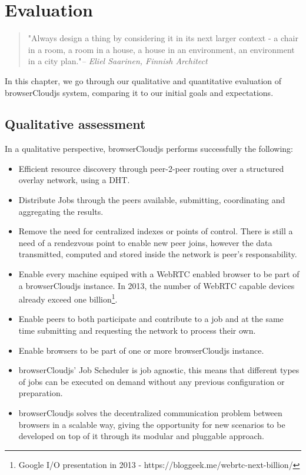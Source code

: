 \chapter{Evaluation}\label{ch:evaluation}

\begin{quotation}
  {\small\it }"Always design a thing by considering it in its next larger context - a chair in a room, a room in a house, a house in an environment, an environment in a city plan."{\small\it -- Eliel Saarinen, Finnish Architect }
\end{quotation}

In this chapter, we go through our qualitative and quantitative evaluation of browserCloudjs system, comparing it to our initial goals and expectations.

\section{Qualitative assessment}

In a qualitative perspective, browserCloudjs performs successfully the following:

\begin{itemize}
    \item Efficient resource discovery through peer-2-peer routing over a structured overlay network, using a DHT.
    \item Distribute Jobs through the peers available, submitting, coordinating and aggregating the results.
    \item Remove the need for centralized indexes or points of control. There is still a need of a rendezvous point to enable new peer joins, however the data transmitted, computed and stored inside the network is peer's responsability.

    \item Enable every machine equiped with a WebRTC enabled browser to be part of a browserCloudjs instance. In 2013, the number of WebRTC capable devices already exceed one billion\footnote{Google I/O presentation in 2013 - https://bloggeek.me/webrtc-next-billion/}.

    \item Enable peers to both participate and contribute to a job and at the same time submitting and requesting the network to process their own.

    \item Enable browsers to be part of one or more browserCloudjs instance.
    \item browserCloudjs' Job Scheduler is job agnostic, this means that different types of jobs can be executed on demand without any previous configuration or preparation.
    \item browserCloudjs solves the decentralized communication problem between browsers in a scalable way, giving the opportunity for new scenarios to be developed on top of it through its modular and pluggable approach.
\end{itemize}

